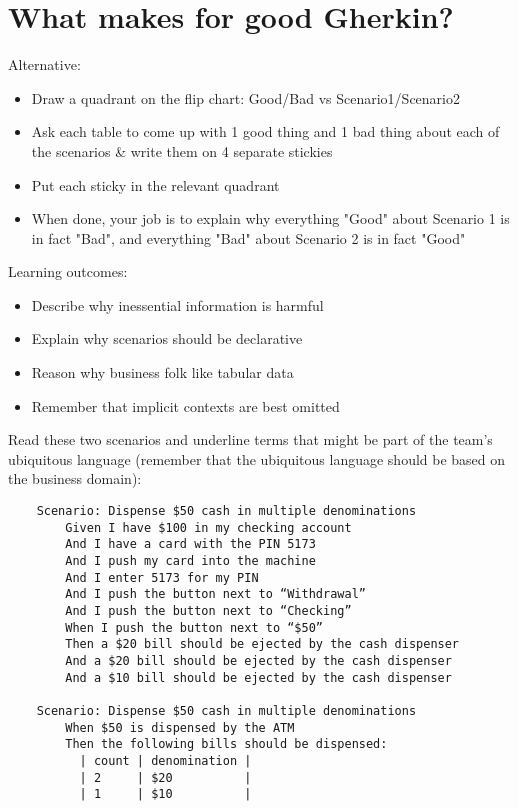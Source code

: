 \chapter*{What makes for good Gherkin?}

\ifnotes

    Alternative:
    
    \begin{itemize}
        \item Draw a quadrant on the flip chart: Good/Bad vs Scenario1/Scenario2
        \item Ask each table to come up with 1 good thing and 1 bad thing about each of the scenarios \& write them on 4 separate stickies
        \item Put each sticky in the relevant quadrant
        \item When done, your job is to explain why everything "Good" about Scenario 1 is in fact "Bad", and everything "Bad" about Scenario 2 is in fact "Good" 
    \end{itemize}

    Learning outcomes:
    
    \begin{itemize}
        \item Describe why inessential information is harmful
        \item Explain why scenarios should be declarative
        \item Reason why business folk like tabular data
        \item Remember that implicit contexts are best omitted
    \end{itemize}

\fi

\ifcontent

    Read these two scenarios and underline terms that might be part of the team's ubiquitous language (remember that the ubiquitous language should be based on the business domain):

\begin{verbatim}
    Scenario: Dispense $50 cash in multiple denominations
        Given I have $100 in my checking account
        And I have a card with the PIN 5173
        And I push my card into the machine
        And I enter 5173 for my PIN
        And I push the button next to “Withdrawal”
        And I push the button next to “Checking”
        When I push the button next to “$50”
        Then a $20 bill should be ejected by the cash dispenser
        And a $20 bill should be ejected by the cash dispenser
        And a $10 bill should be ejected by the cash dispenser
      
    Scenario: Dispense $50 cash in multiple denominations
        When $50 is dispensed by the ATM
        Then the following bills should be dispensed:
          | count | denomination |
          | 2     | $20          |
          | 1     | $10          |
    
\end{verbatim}

